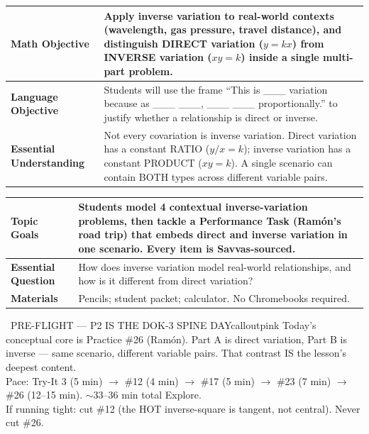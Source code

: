 \documentclass[11pt]{article}
\begin{document}

{\small
\renewcommand{\arraystretch}{1.25}
\noindent\begin{tabular}{|p{1.8in}|p{4.8in}|}
\hline
\textbf{Math Objective} & Apply inverse variation to real-world contexts (wavelength, gas pressure, travel distance), and distinguish DIRECT variation (\(y = kx\)) from INVERSE variation (\(xy = k\)) inside a single multi-part problem. \\ \hline
\textbf{Language Objective} & Students will use the frame “This is \_\_\_ variation because as \_\_\_ \_\_\_, \_\_\_ \_\_\_ proportionally.” to justify whether a relationship is direct or inverse. \\ \hline
\textbf{Essential Understanding} & Not every covariation is inverse variation. Direct variation has a constant RATIO (\(y/x = k\)); inverse variation has a constant PRODUCT (\(xy = k\)). A single scenario can contain BOTH types across different variable pairs. \\ \hline
\end{tabular}
}

{\small
\renewcommand{\arraystretch}{1.25}
\noindent\begin{tabular}{|p{1.8in}|p{4.8in}|}
\hline
\textbf{Topic Goals} & Students model 4 contextual inverse-variation problems, then tackle a Performance Task (Ramón's road trip) that embeds direct and inverse variation in one scenario. Every item is Savvas-sourced. \\ \hline
\textbf{Essential Question} & How does inverse variation model real-world relationships, and how is it different from direct variation? \\ \hline
\textbf{Materials} & Pencils; student packet; calculator. No Chromebooks required. \\ \hline
\end{tabular}
}

\begin{callout}{\IconPin\ PRE-FLIGHT — P2 IS THE DOK-3 SPINE DAY}{calloutpink}
Today's conceptual core is Practice \#26 (Ramón). Part A is direct variation, Part B is inverse — same scenario, different variable pairs. That contrast IS the lesson's deepest content.\\
Pace: Try-It 3 (5 min) \(\rightarrow\) \#12 (4 min) \(\rightarrow\) \#17 (5 min) \(\rightarrow\) \#23 (7 min) \(\rightarrow\) \#26 (12--15 min). \(\sim\)33--36 min total Explore.\\
If running tight: cut \#12 (the HOT inverse-square is tangent, not central). Never cut \#26.
\end{callout}
\end{document}
